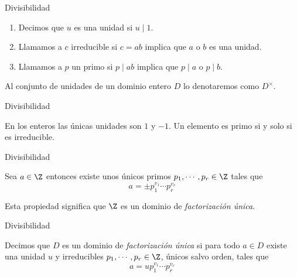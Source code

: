 \begin{frame}{Divisibilidad}
  \begin{definition}
    \begin{enumerate}[<+->]
      \item Decimos que $u$ es una unidad si $u \mid 1$.
      
      \bigskip

      \item Llamamos a $c$ irreducible si $c = ab$ implica que $a$ o $b$ es una unidad.
      
      \bigskip

      \item Llamamos a $p$ un primo si $p \mid ab$ implica que $p \mid a$ o $p \mid b$.
    \end{enumerate}
  \end{definition}


  \pause\bigskip
  Al conjunto de unidades de un dominio entero $D$ lo denotaremos como $D^\times$.
\end{frame}


\begin{frame}{Divisibilidad}
  \begin{proposition}
    En los enteros las únicas unidades son $1$ y $-1$. Un elemento es primo si y solo si es irreducible.
  \end{proposition}
\end{frame}

\begin{frame}{Divisibilidad}
  \begin{theorem}
    Sea $a \in \Z$ entonces existe unos únicos primos $p_1, \cdots, p_r \in \Z$ tales que
    \[
      a = \pm p_1^{v_1} \cdots p_r^{v_r}
    \]
  \end{theorem}

  \pause\bigskip
  Esta propiedad significa que $\Z$ es un dominio de \emph{factorización única}.
\end{frame}


\begin{frame}{Divisibilidad}
  \begin{definition}
    Decimos que $D$ es un dominio de \emph{factorización única} si para todo $a \in D$ existe una unidad $u$ y irreducibles $p_1, \cdots, p_r \in \Z$, únicos salvo orden, tales que
    \[
      a = u p_1^{v_1} \cdots p_r^{v_r}
    \]
  \end{definition}
\end{frame}


